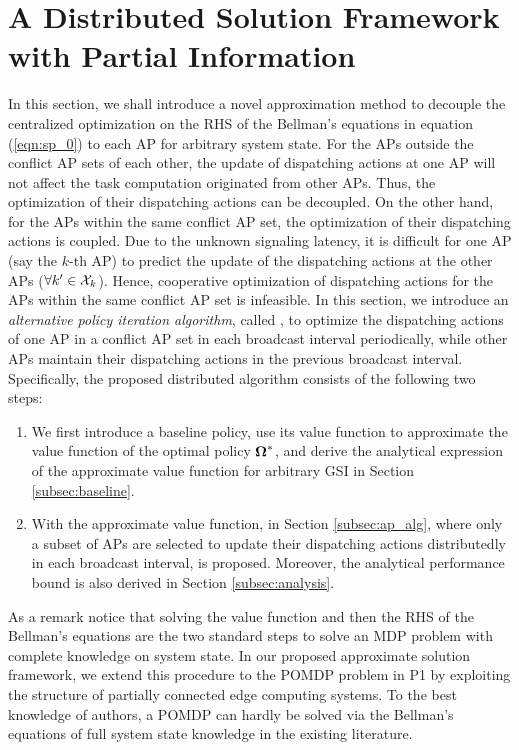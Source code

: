 \section{A Distributed Solution Framework with Partial Information}
\label{sec:algorithm}
In this section, we shall introduce a novel approximation method to decouple the centralized optimization on the RHS of the Bellman's equations in equation (\ref{eqn:sp_0}) to each AP for arbitrary system state.
For the APs outside the conflict AP sets of each other, the update of dispatching actions at one AP will not affect the task computation originated from other APs.
Thus, the optimization of their dispatching actions can be decoupled.
On the other hand, for the APs within the same conflict AP set, the optimization of their dispatching actions is coupled.
Due to the unknown signaling latency, it is difficult for one AP (say the $k$-th AP) to predict the update of the dispatching actions at the other APs ($\forall k' \in\mathcal{X}_{k}$).
Hence, cooperative optimization of dispatching actions for the APs within the same conflict AP set is infeasible.
In this section, we introduce an \emph{alternative policy iteration algorithm}, called \algname, to optimize the dispatching actions of one AP in a conflict AP set in each broadcast interval periodically, while other APs maintain their dispatching actions in the previous broadcast interval.
Specifically, the proposed distributed algorithm consists of the following two steps:
\begin{enumerate}
    \item We first introduce a baseline policy, use its value function to approximate the value function of the optimal policy $\boldsymbol{\Omega}^*$, and derive the analytical expression of the approximate value function for arbitrary GSI in Section \ref{subsec:baseline}.
    \item With the approximate value function, in Section \ref{subsec:ap_alg}, 
    where only a subset of APs are selected to update their dispatching actions distributedly in each broadcast interval, is proposed.
    Moreover, the analytical performance bound is also derived in Section \ref{subsec:analysis}.
\end{enumerate}
As a remark notice that solving the value function and then the RHS of the Bellman's equations are the two standard steps to solve an MDP problem with complete knowledge on system state.
In our proposed approximate solution framework, we extend this procedure to the POMDP problem in P1 by exploiting the structure of partially connected edge computing systems.
To the best knowledge of authors, a POMDP can hardly be solved via the Bellman's equations of full system state knowledge in the existing literature.

